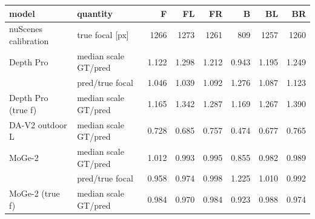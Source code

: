 \footnotesize\renewcommand{\arraystretch}{0.92}
\begin{tabular}{llrrrrrr}
\toprule
model & quantity & F & FL & FR & B & BL & BR \\
\midrule
nuScenes calibration & true focal [px] & 1266 & 1273 & 1261 & 809 & 1257 & 1260 \\
\midrule
Depth Pro & median scale GT/pred & 1.122 & 1.298 & 1.212 & 0.943 & 1.195 & 1.249 \\
 & pred/true focal & 1.046 & 1.039 & 1.092 & 1.276 & 1.087 & 1.123 \\
Depth Pro (true f) & median scale GT/pred & 1.165 & 1.342 & 1.287 & 1.169 & 1.267 & 1.390 \\
DA-V2 outdoor L & median scale GT/pred & 0.728 & 0.685 & 0.757 & 0.474 & 0.677 & 0.765 \\
MoGe-2 & median scale GT/pred & 1.012 & 0.993 & 0.995 & 0.855 & 0.982 & 0.989 \\
 & pred/true focal & 0.958 & 0.974 & 0.998 & 1.225 & 1.010 & 0.992 \\
MoGe-2 (true f) & median scale GT/pred & 0.984 & 0.970 & 0.984 & 0.923 & 0.988 & 0.974 \\
\bottomrule
\end{tabular}
